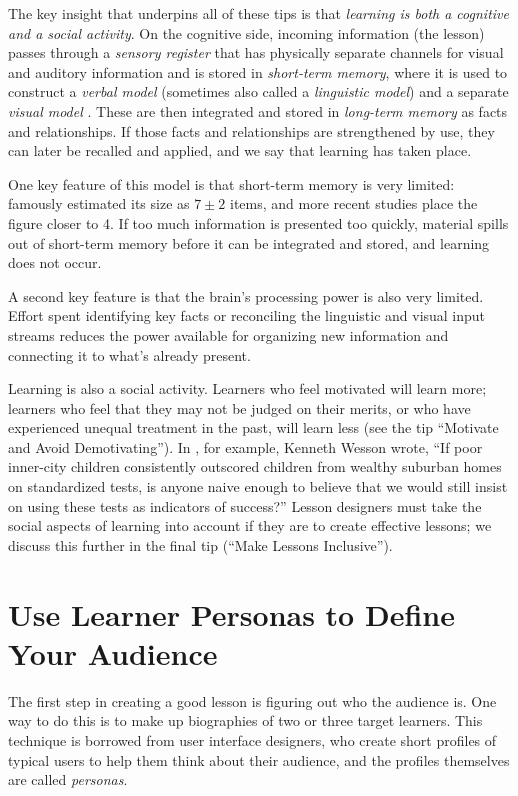 \documentclass[10pt,letterpaper]{article}
\newcommand{\rulemajor}[1]{\section{#1}}
\begin{document}
The key insight that underpins all of these tips is that \emph{learning is both
  a cognitive and a social activity}.  On the cognitive side, incoming
information (the lesson) passes through a \emph{sensory register} that has
physically separate channels for visual and auditory information and is stored
in \emph{short-term memory}, where it is used to construct a \emph{verbal model}
(sometimes also called a \emph{linguistic model}) and a separate \emph{visual
  model} \cite{Maye2009}.  These are then integrated and stored in
\emph{long-term memory} as facts and relationships.  If those facts and
relationships are strengthened by use, they can later be recalled and applied,
and we say that learning has taken place.

One key feature of this model is that short-term memory is very limited:
\cite{Mill1956} famously estimated its size as $7{\pm}2$ items, and more
recent studies place the figure closer to 4.  If too much information is
presented too quickly, material spills out of short-term memory before it can be
integrated and stored, and learning does not occur.

A second key feature is that the brain's processing power is also very limited.
Effort spent identifying key facts or reconciling the linguistic and visual
input streams reduces the power available for organizing new information and
connecting it to what's already present.

Learning is also a social activity. Learners who feel motivated will learn more;
learners who feel that they may not be judged on their merits, or who have
experienced unequal treatment in the past, will learn less (see the tip
``Motivate and Avoid Demotivating''). In \cite{Litt2004}, for example, Kenneth
Wesson wrote, ``If poor inner-city children consistently outscored children from
wealthy suburban homes on standardized tests, is anyone naive enough to believe
that we would still insist on using these tests as indicators of success?''
Lesson designers must take the social aspects of learning into account if they
are to create effective lessons; we discuss this further in the final tip
(``Make Lessons Inclusive'').

\rulemajor{Use Learner Personas to Define Your Audience}

The first step in creating a good lesson is figuring out who the audience is.
One way to do this is to make up biographies of two or three target learners.
This technique is borrowed from user interface designers, who create short
profiles of typical users to help them think about their audience, and the
profiles themselves are called \emph{personas}.
\end{document}
